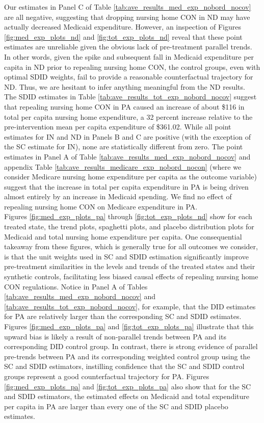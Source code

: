 \documentclass[../Main.tex]{subfiles}
\begin{document}
\indent Our estimates in Panel C of Table \ref{tab:ave_results_med_exp_nobord_nocov} are all negative, suggesting that dropping nursing home CON in ND may have actually decreased Medicaid expenditure. However, an inspection of Figures \ref{fig:med_exp_plots_nd} and \ref{fig:tot_exp_plots_nd} reveal that these point estimates are unreliable given the obvious lack of pre-treatment parallel trends. In other words, given the spike and subsequent fall in Medicaid expenditure per capita in ND prior to repealing nursing home CON, the control groups, even with optimal SDID weights, fail to provide a reasonable counterfactual trajectory for ND. Thus, we are hesitant to infer anything meaningful from the ND results.\\
\indent The SDID estimates in Table \ref{tab:ave_results_tot_exp_nobord_nocov} suggest that repealing nursing home CON in PA caused an increase of about \$116 in total per capita nursing home expenditure, a 32 percent increase relative to the pre-intervention mean per capita expenditure of \$361.02. While all point estimates for IN and ND in Panels B and C are positive (with the exception of the SC estimate for IN), none are statistically different from zero. The point estimates in Panel A of Table \ref{tab:ave_results_med_exp_nobord_nocov} and appendix Table \ref*{tab:ave_results_medicare_exp_nobord_nocon} (where we consider Medicare nursing home expenditure per capita as the outcome variable) suggest that the increase in total per capita expenditure in PA is being driven almost entirely by an increase in Medicaid spending. We find no effect of repealing nursing home CON on Medicare expenditure in PA. \\
\indent Figures \ref{fig:med_exp_plots_pa} through \ref{fig:tot_exp_plots_nd} show for each treated state, the trend plots, spaghetti plots, and placebo distribution plots for Medicaid and total nursing home expenditure per capita. One consequential takeaway from these figures, which is generally true for all outcomes we consider, is that the unit weights used in SC and SDID estimation significantly improve pre-treatment similarities in the levels and trends of the treated states and their synthetic controls, facilitating less biased causal effects of repealing nursing home CON regulations. Notice in Panel A of Tables \ref{tab:ave_results_med_exp_nobord_nocov} and \ref{tab:ave_results_tot_exp_nobord_nocov}, for example, that the DID estimates for PA are relatively larger than the corresponding SC and SDID estimates. Figures \ref{fig:med_exp_plots_pa} and \ref{fig:tot_exp_plots_pa} illustrate that this upward bias is likely a result of non-parallel trends between PA and its corresponding DID control group. In contrast, there is strong evidence of parallel pre-trends between PA and its corresponding weighted control group using the SC and SDID estimators, instilling confidence that the SC and SDID control groups represent a good counterfactual trajectory for PA. Figures \ref{fig:med_exp_plots_pa} and \ref{fig:tot_exp_plots_pa} also show that for the SC and SDID estimators, the estimated effects on Medicaid and total expenditure per capita in PA are larger than every one of the SC and SDID placebo estimates.\\
\end{document}
